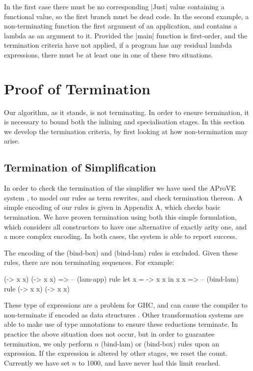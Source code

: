 \documentclass[preprint]{sigplanconf}
\begin{document}
In the first case there must be no corresponding |Just| value containing a functional value, so the first branch must be dead code. In the second example, a non-terminating function the first argument of an application, and contains a lambda as an argument to it. Provided the |main| function is first-order, and the termination criteria have not applied, if a program has any residual lambda expressions, there must be at least one in one of these two situations.


\section{Proof of Termination}
\label{sec:termination}

Our algorithm, as it stands, is not terminating. In order to ensure termination, it is necessary to bound both the inlining and specialisation stages. In this section we develop the termination criteria, by first looking at how non-termination may arise.

\subsection{Termination of Simplification}
\label{sec:termination_simplification}

In order to check the termination of the simplifier we have used the AProVE system \cite{aprove}, to model our rules as term rewrites, and check termination thereon. A simple encoding of our rules is given in Appendix A, which checks basic termination. We have proven termination using both this simple formulation, which considers all constructors to have one alternative of exactly arity one, and a more complex encoding. In both cases, the system is able to report success.

The encoding of the (bind-box) and (bind-lam) rules is excluded. Given these rules, there are non terminating sequences. For example:

\ignore\begin{code}
(\x -> x x) (\x -> x x)
   => -- (lam-app) rule
let x = \x -> x x in x x
   => -- (bind-lam) rule
(\x -> x x) (\x -> x x)
\end{code}

These type of expressions are a problem for GHC, and can cause the compiler to non-terminate if encoded as data structures \cite{spj:inlining}. Other transformation systems \cite{chin:higher_order_removal} are able to make use of type annotations to ensure these reductions terminate. In practice the above situation does not occur, but in order to guarantee termination, we only perform $n$ (bind-lam) or (bind-box) rules upon an expression. If the expression is altered by other stages, we reset the count. Currently we have set $n$ to 1000, and have never had this limit reached.
\end{document}
